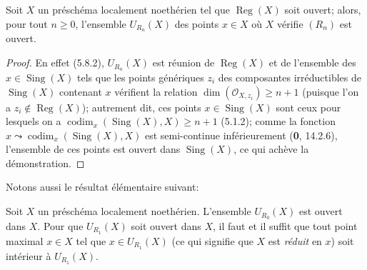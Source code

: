 \begin{proposition}[6.12.9]
\label{IV.2.s6.12.9-fr}
Soit $X$ un préschéma localement noethérien tel que $\operatorname{Reg}(X)$
soit ouvert; alors, pour tout $n\geq0$, l'ensemble $U_{R_n}(X)$ des points
$x\in X$ où $X$ vérifie $(R_n)$ est ouvert.
\end{proposition}

\begin{proof}
En effet (5.8.2), $U_{R_n}(X)$ est réunion de $\operatorname{Reg}(X)$ et de
l'ensemble des $x\in\operatorname{Sing}(X)$ tels que les points génériques
$z_i$ des composantes irréductibles de $\operatorname{Sing}(X)$ contenant
$x$ vérifient la relation $\dim(\mathcal O_{X,z_i})\geq n+1$ (puisque l'on a
$z_i\notin\operatorname{Reg}(X)$); autrement dit, ces points
$x\in\operatorname{Sing}(X)$ sont ceux pour lesquels on a
$\operatorname{codim}_x(\operatorname{Sing}(X),X)\geq n+1$ (5.1.2); comme
la fonction $x\leadsto\operatorname{codim}_x(\operatorname{Sing}(X),X)$ est
semi-continue inférieurement (\textbf{0}, 14.2.6), l'ensemble de ces points est
ouvert dans $\operatorname{Sing}(X)$, ce qui achève la démonstration.
\end{proof}

Notons aussi le résultat élémentaire suivant:

\begin{proposition}[6.12.10]
\label{IV.2.s6.12.10-fr}
Soit $X$ un préschéma localement noethérien. L'ensemble $U_{R_0}(X)$ est
ouvert dans $X$. Pour que $U_{R_1}(X)$ soit ouvert dans $X$, il faut et il
suffit que tout point maximal $x\in X$ tel que $x\in U_{R_1}(X)$ \textup{(ce qui
signifie que $X$ est \emph{réduit} en $x$)} soit intérieur à $U_{R_1}(X)$.
\end{proposition}

